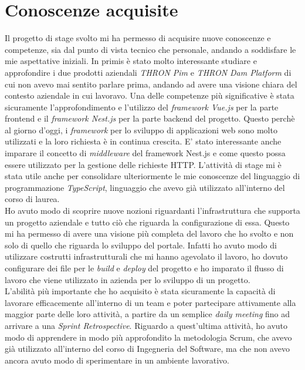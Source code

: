 \section{Conoscenze acquisite}
Il progetto di stage svolto mi ha permesso di acquisire nuove conoscenze e competenze, sia dal punto di vista tecnico che personale, andando a soddisfare le mie aspettative iniziali.
In primis è stato molto interessante studiare e approfondire i due prodotti aziendali \textit{THRON Pim} e \textit{THRON Dam Platform} di cui non avevo mai sentito parlare prima, andando ad avere una visione chiara del contesto aziendale in cui lavoravo.
Una delle competenze più significative è stata sicuramente l'approfondimento e l'utilizzo del \textit{framework Vue.js} per la parte frontend e il \textit{framework Nest.js} per la parte backend del progetto.
Questo perchè al giorno d'oggi, i \textit{framework} per lo sviluppo di applicazioni web sono molto utilizzati e la loro richiesta è in continua crescita. 
E' stato interessante anche imparare il concetto di \textit{middleware} del framework Nest.js e come questo possa essere utilizzato per la gestione delle richieste HTTP.
L'attività di stage mi è stata utile anche per consolidare ulteriormente le mie conoscenze del linguaggio di programmazione \textit{TypeScript}, linguaggio che avevo già utilizzato all'interno del corso di laurea.\\
Ho avuto modo di scoprire nuove nozioni riguardanti l'infrastruttura che supporta un progetto aziendale e tutto ciò che riguarda la configurazione di essa. Questo mi ha permesso di avere una visione
più completa del lavoro che ho svolto e non solo di quello che riguarda lo sviluppo del portale. Infatti ho avuto modo di utilizzare costrutti infrastrutturali che mi hanno agevolato il lavoro, ho dovuto configurare dei file per le \textit{build} e \textit{deploy} del progetto e ho imparato il flusso di lavoro che viene utilizzato in azienda per lo sviluppo di un progetto.\\
L'abilità più importante che ho acquisito è stata sicuramente la capacità di lavorare efficacemente all'interno di un team e poter partecipare attivamente alla maggior parte delle loro attività, a partire da un semplice \textit{daily meeting} fino ad arrivare a una \textit{Sprint Retrospective}.
Riguardo a quest'ultima attività, ho avuto modo di apprendere in modo più approfondito la metodologia Scrum, che avevo già utilizzato all'interno del corso di Ingegneria del Software, ma che non avevo ancora avuto modo di sperimentare in un ambiente lavorativo.

